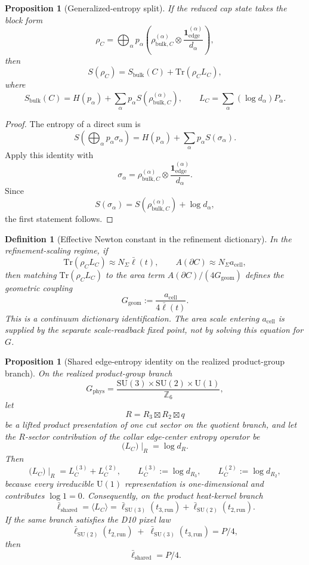 \documentclass[11pt]{article}
\newtheorem{proposition}[theorem]{Proposition}
\newtheorem{definition}[theorem]{Definition}
\newcommand{\SU}{\mathrm{SU}}
\newcommand{\U}{\mathrm{U}}
\newcommand{\ellbar}{\bar{\ell}}
\begin{document}
\begin{proposition}[Generalized-entropy split]\label{prop:gensplit}
If the reduced cap state takes the block form
\[
\rho_C=
\bigoplus_\alpha p_\alpha
\left(
\rho^{(\alpha)}_{\mathrm{bulk},C}\otimes
\frac{\mathbf 1^{(\alpha)}_{\mathrm{edge}}}{d_\alpha}
\right),
\]
then
\[
S(\rho_C)=S_{\mathrm{bulk}}(C)+\mathrm{Tr}(\rho_C L_C),
\]
where
\[
S_{\mathrm{bulk}}(C)=H(p_\alpha)+\sum_\alpha p_\alpha S(\rho^{(\alpha)}_{\mathrm{bulk},C}),
\qquad
L_C=\sum_\alpha (\log d_\alpha)P_\alpha.
\]
\end{proposition}

\begin{proof}
The entropy of a direct sum is
\[
S\!\left(\bigoplus_\alpha p_\alpha \sigma_\alpha\right)
=
H(p_\alpha)+\sum_\alpha p_\alpha S(\sigma_\alpha).
\]
Apply this identity with
\[
\sigma_\alpha=
\rho^{(\alpha)}_{\mathrm{bulk},C}\otimes
\frac{\mathbf 1^{(\alpha)}_{\mathrm{edge}}}{d_\alpha}.
\]
Since
\[
S(\sigma_\alpha)=S(\rho^{(\alpha)}_{\mathrm{bulk},C})+\log d_\alpha,
\]
the first statement follows.
\end{proof}

\begin{definition}[Effective Newton constant in the refinement dictionary]\label{def:newton}
In the refinement-scaling regime, if
\[
\mathrm{Tr}(\rho_C L_C)\approx N_\Sigma \bar\ell(t),
\qquad
A(\partial C)\approx N_\Sigma a_{\mathrm{cell}},
\]
then matching $\mathrm{Tr}(\rho_C L_C)$ to the area term \(A(\partial C)/(4G_{\mathrm{geom}})\) defines the geometric coupling
\[
G_{\mathrm{geom}}:=\frac{a_{\mathrm{cell}}}{4\bar\ell(t)}.
\]
This is a continuum dictionary identification. The area scale entering \(a_{\mathrm{cell}}\) is
supplied by the separate scale-readback fixed point, not by solving this equation for \(G\).
\end{definition}

\begin{proposition}[Shared edge-entropy identity on the realized product-group branch]\label{prop:sharededgeentropy}
On the realized product-group branch
\[
G_{\mathrm{phys}}
=
\frac{\SU(3)\times\SU(2)\times\U(1)}{\mathbb Z_6},
\]
let
\[
R=R_3\boxtimes R_2\boxtimes q
\]
be a lifted product presentation of one cut sector on the quotient branch, and let the
\(R\)-sector contribution of the collar edge-center entropy operator be
\[
\bigl(L_C\bigr)\!\mid_R=\log d_R.
\]
Then
\[
\bigl(L_C\bigr)\!\mid_R
=
L_C^{(3)}+L_C^{(2)},
\qquad
L_C^{(3)}:=\log d_{R_3},
\qquad
L_C^{(2)}:=\log d_{R_2},
\]
because every irreducible \( \U(1) \) representation is one-dimensional and contributes \(\log 1=0\). Consequently, on the product heat-kernel branch
\[
\ellbar_{\mathrm{shared}}
=
\langle L_C\rangle
=
\ellbar_{\mathrm{SU(3)}}(t_{3,\mathrm{run}})
+
\ellbar_{\mathrm{SU(2)}}(t_{2,\mathrm{run}}).
\]
If the same branch satisfies the D10 pixel law
\[
\ellbar_{\mathrm{SU(2)}}(t_{2,\mathrm{run}})
\;+\;
\ellbar_{\mathrm{SU(3)}}(t_{3,\mathrm{run}})
=
P/4,
\]
then
\[
\ellbar_{\mathrm{shared}}=P/4.
\]
\end{proposition}
\end{document}
